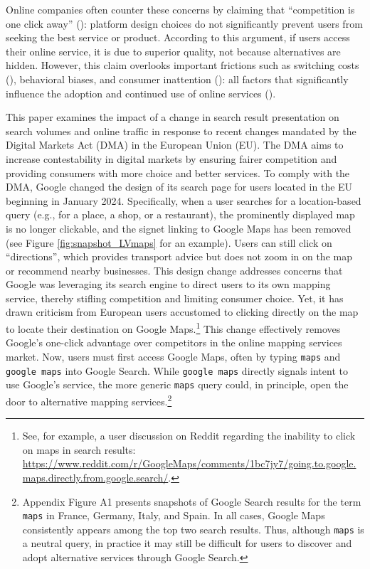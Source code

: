 \documentclass[11pt]{article}
\begin{document}
	Online companies often counter these concerns by claiming that ``competition is one click away'' (\citealp{helft2009google}): platform design choices do not significantly prevent users from seeking the best service or product. According to this argument, if users access their online service, it is due to superior quality, not because alternatives are hidden. However, this claim overlooks important frictions such as switching costs (\citealp{farrell2007coordination}), behavioral biases, and consumer inattention (\citealp{einav2023selling, miller2023sophisticated}): all factors that significantly influence the adoption and continued use of online services (\citealp{allcott2025sources}).
	
	This paper examines the impact of a change in search result presentation on search volumes and online traffic in response to recent changes mandated by the Digital Markets Act (DMA) in the European Union (EU). The DMA aims to increase contestability in digital markets by ensuring fairer competition and providing consumers with more choice and better services. To comply with the DMA, Google changed the design of its search page for users located in the EU beginning in January 2024. Specifically, when a user searches for a location-based query (e.g., for a place, a shop, or a restaurant), the prominently displayed map is no longer clickable, and the signet linking to Google Maps has been removed (see Figure \ref{fig:snapshot_LVmaps} for an example). Users can still click on ``directions'', which provides transport advice but does not zoom in on the map or recommend nearby businesses. This design change addresses concerns that Google was leveraging its search engine to direct users to its own mapping service, thereby stifling competition and limiting consumer choice. Yet, it has drawn criticism from European users accustomed to clicking directly on the map to locate their destination on Google Maps.\footnote{See, for example, a user discussion on Reddit regarding the inability to click on maps in search results: \href{https://www.reddit.com/r/GoogleMaps/comments/1bc7jy7/going_to_google_maps_directly_from_google_search/}{https://www.reddit.com/r/GoogleMaps/comments/1bc7jy7/going.to.google.maps.directly.from.google.search/}.} This change effectively removes Google’s one-click advantage over competitors in the online mapping services market. Now, users must first access Google Maps, often by typing \texttt{maps} and \texttt{google maps} into Google Search. While \texttt{google maps} directly signals intent to use Google’s service, the more generic \texttt{maps} query could, in principle, open the door to alternative mapping services.\footnote{Appendix Figure A1 presents snapshots of Google Search results for the term \texttt{maps} in France, Germany, Italy, and Spain. In all cases, Google Maps consistently appears among the top two search results. Thus, although \texttt{maps} is a neutral query, in practice it may still be difficult for users to discover and adopt alternative services through Google Search.}
	
\end{document}
